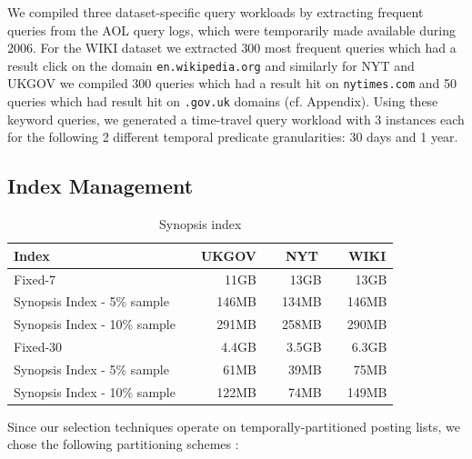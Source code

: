 We compiled three dataset-specific query workloads by extracting
frequent queries from the AOL query logs, which were temporarily made
available during 2006. For the WIKI dataset we extracted 300 most
frequent queries which had a result click on the domain
\texttt{en.wikipedia.org} and similarly for NYT and UKGOV we compiled
300 queries which had a result hit on \texttt{nytimes.com} and
50 queries which had result hit on \texttt{.gov.uk} domains (cf. Appendix).  Using these keyword queries, we generated a
time-travel query workload with 3 instances each for the following 2
different temporal predicate granularities: 30 days and 1 year. 



\subsection{Index Management}

\begin{table}[!ht]
\centering
\begin{tabular}{@{}llrcrcr@{}}\toprule
 \multicolumn{2}{l}{\textbf{Index}}& \multicolumn{1}{c}{\textbf{UKGOV}} & \phantom{ab} & \multicolumn{1}{c}{\textbf{NYT}}& \phantom{ab} & \multicolumn{1}{c}{\textbf{WIKI}}\\ 
 \midrule
    Fixed-7 && 11GB && 13GB && 13GB \\
    Synopsis Index - 5\% sample && 146MB && 134MB && 146MB \\
    Synopsis Index - 10\% sample && 291MB && 258MB && 290MB \\
\midrule
    Fixed-30 && 4.4GB && 3.5GB && 6.3GB \\
    Synopsis Index - 5\% sample && 61MB && 39MB && 75MB \\
    Synopsis Index - 10\% sample && 122MB && 74MB && 149MB \\
 
 \bottomrule
\end{tabular}
\caption{Synopsis index}
  \label{tab:syndex}
\end{table}

Since our selection techniques operate on temporally-partitioned posting lists, we chose the following partitioning schemes :

